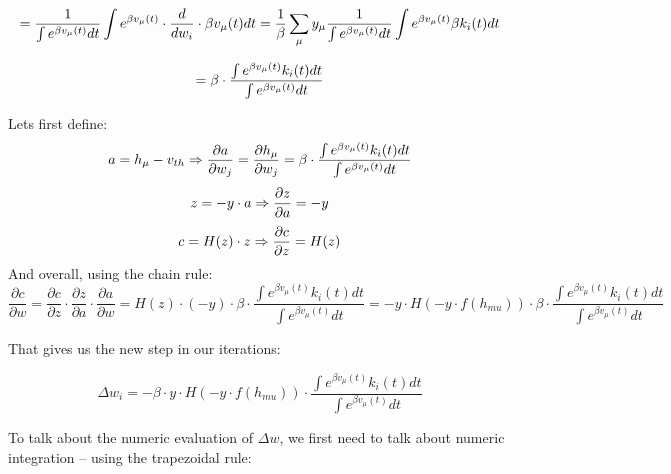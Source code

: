 \begin{equation} \notag
= \frac{1}{\int e^{\beta v_{\mu}(t)} dt}\int e^{\beta v_{\mu}(t)} \cdot \frac{d}{dw_i} \cdot \beta v_{\mu}(t) dt = \frac{1}{\beta}\sum_{\mu}{y_{\mu}\frac{1}{\int e^{\beta v_{\mu}(t)} dt}\int e^{\beta v_{\mu}(t)} \beta k_i(t) dt}
\end{equation}

\begin{equation} \notag
= \beta \cdot \frac{\int e^{\beta v_{\mu}(t)} k_i(t) dt}{\int e^{\beta v_{\mu}(t)} dt}
\end{equation}

Lets first define:
\begin{equation} \notag
    a = h_{\mu} - v_{th} \Rightarrow \frac{\partial{a}}{\partial{w_j}} = \frac{\partial{h_{\mu}}}{\partial{w_j}} = \beta \cdot \frac{\int e^{\beta v_{\mu}(t)} k_i(t) dt}{\int e^{\beta v_{\mu}(t)} dt}
\end{equation}
\begin{equation} \notag
    z = -y \cdot a \Rightarrow \frac{\partial{z}}{\partial{a}} = -y
\end{equation}
\begin{equation} \notag
    c = H(z) \cdot z \Rightarrow \frac{\partial{c}}{\partial{z}} = H(z)
\end{equation}
And overall, using the chain rule:
\begin{equation}
    \frac{\partial{c}}{\partial{w}} = \frac{\partial{c}}{\partial{z}} \cdot \frac{\partial{z}}{\partial{a}} \cdot \frac{\partial{a}}{\partial{w}} = H(z) \cdot (-y) \cdot \beta \cdot \frac{\int e^{\beta v_{\mu}(t)} k_i(t) dt}{\int e^{\beta v_{\mu}(t)} dt} = -y \cdot H(-y \cdot f(h_{mu})) \cdot \beta \cdot \frac{\int e^{\beta v_{\mu}(t)} k_i(t) dt}{\int e^{\beta v_{\mu}(t)} dt}
\end{equation}

That gives us the new step in our iterations:

\begin{equation}
\Delta w_i =- \beta \cdot y \cdot H(-y \cdot f(h_{mu})) \cdot \frac{\int e^{\beta v_{\mu}(t)} k_i(t) dt}{\int e^{\beta v_{\mu}(t)} dt}
\end{equation}

To talk about the numeric evaluation of $\Delta w$, we first need to talk about numeric integration – using the trapezoidal rule:

\newtheorem{theorem}{Theorem}

